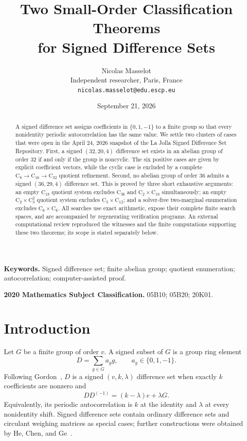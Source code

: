 \documentclass[11pt]{article}
\title{Two Small-Order Classification Theorems\\
for Signed Difference Sets}
\author{Nicolas Masselot\\\small Independent researcher, Paris, France\\
\small \texttt{nicolas.masselot@edu.escp.eu}}
\date{September 21, 2026}
\theoremstyle{remark}
\newcommand{\C}{\mathrm{C}}
\begin{document}
\maketitle

\begin{abstract}
A signed difference set assigns coefficients in $\{0,1,-1\}$ to a finite
group so that every nonidentity periodic autocorrelation has the same value.
We settle two clusters of cases that were open in the April 24, 2026 snapshot
of the La Jolla Signed Difference Set Repository.  First, a signed
$(32,20,4)$ difference set exists in an abelian group of order $32$ if and
only if the group is noncyclic.  The six positive cases are given by explicit
coefficient vectors, while the cyclic case is excluded by a complete
$\C_8\to\C_{16}\to\C_{32}$ quotient refinement.  Second, no abelian group
of order $36$ admits a signed $(36,29,4)$ difference set.  This is proved by
three short exhaustive arguments: an empty $\C_{18}$ quotient system excludes
$\C_{36}$ and $\C_2\times\C_{18}$ simultaneously; an empty
$\C_2\times\C_3^2$ quotient system excludes $\C_3\times\C_{12}$; and a
solver-free two-marginal enumeration excludes $\C_6\times\C_6$.  All searches
use exact arithmetic, expose their complete finite search spaces, and are
accompanied by regenerating verification programs.  An external
computational review reproduced the witnesses and the finite computations
supporting these two theorems; its scope is stated separately below.
\end{abstract}

\noindent\textbf{Keywords.}
Signed difference set; finite abelian group; quotient enumeration;
autocorrelation; computer-assisted proof.

\medskip
\noindent\textbf{2020 Mathematics Subject Classification.}
05B10; 05B20; 20K01.

\section{Introduction}

Let $G$ be a finite group of order $v$.  A signed subset of $G$ is a group
ring element
\[
    D=\sum_{g\in G} a_g g, \qquad a_g\in\{0,1,-1\}.
\]
Following Gordon~\cite{gordon}, $D$ is a signed $(v,k,\lambda)$ difference
set when exactly $k$ coefficients are nonzero and
\begin{equation}\label{eq:sds}
    DD^{(-1)}=(k-\lambda)e+\lambda G.
\end{equation}
Equivalently, its periodic autocorrelation is $k$ at the identity and
$\lambda$ at every nonidentity shift.  Signed difference sets contain
ordinary difference sets and circulant weighing matrices as special cases;
further constructions were obtained by He, Chen, and Ge~\cite{hechenge}.
\end{document}

